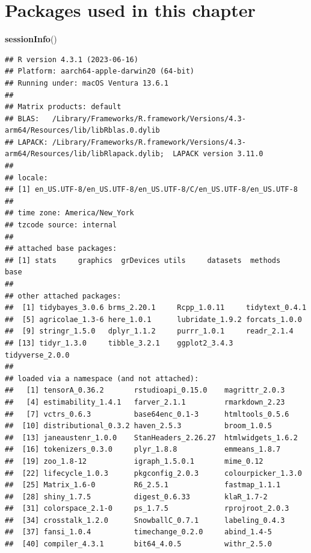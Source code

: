 \documentclass[
]{book}
\newenvironment{Shaded}{\begin{snugshade}}{\end{snugshade}}
\newcommand{\FunctionTok}[1]{\textcolor[rgb]{0.13,0.29,0.53}{\textbf{#1}}}
\newcommand{\NormalTok}[1]{#1}
\begin{document}
\section{Packages used in this chapter}\label{packages-used-in-this-chapter-1}

\begin{Shaded}
\begin{Highlighting}[]
\FunctionTok{sessionInfo}\NormalTok{()}
\end{Highlighting}
\end{Shaded}

\begin{verbatim}
## R version 4.3.1 (2023-06-16)
## Platform: aarch64-apple-darwin20 (64-bit)
## Running under: macOS Ventura 13.6.1
## 
## Matrix products: default
## BLAS:   /Library/Frameworks/R.framework/Versions/4.3-arm64/Resources/lib/libRblas.0.dylib 
## LAPACK: /Library/Frameworks/R.framework/Versions/4.3-arm64/Resources/lib/libRlapack.dylib;  LAPACK version 3.11.0
## 
## locale:
## [1] en_US.UTF-8/en_US.UTF-8/en_US.UTF-8/C/en_US.UTF-8/en_US.UTF-8
## 
## time zone: America/New_York
## tzcode source: internal
## 
## attached base packages:
## [1] stats     graphics  grDevices utils     datasets  methods   base     
## 
## other attached packages:
##  [1] tidybayes_3.0.6 brms_2.20.1     Rcpp_1.0.11     tidytext_0.4.1 
##  [5] agricolae_1.3-6 here_1.0.1      lubridate_1.9.2 forcats_1.0.0  
##  [9] stringr_1.5.0   dplyr_1.1.2     purrr_1.0.1     readr_2.1.4    
## [13] tidyr_1.3.0     tibble_3.2.1    ggplot2_3.4.3   tidyverse_2.0.0
## 
## loaded via a namespace (and not attached):
##   [1] tensorA_0.36.2       rstudioapi_0.15.0    magrittr_2.0.3      
##   [4] estimability_1.4.1   farver_2.1.1         rmarkdown_2.23      
##   [7] vctrs_0.6.3          base64enc_0.1-3      htmltools_0.5.6     
##  [10] distributional_0.3.2 haven_2.5.3          broom_1.0.5         
##  [13] janeaustenr_1.0.0    StanHeaders_2.26.27  htmlwidgets_1.6.2   
##  [16] tokenizers_0.3.0     plyr_1.8.8           emmeans_1.8.7       
##  [19] zoo_1.8-12           igraph_1.5.0.1       mime_0.12           
##  [22] lifecycle_1.0.3      pkgconfig_2.0.3      colourpicker_1.3.0  
##  [25] Matrix_1.6-0         R6_2.5.1             fastmap_1.1.1       
##  [28] shiny_1.7.5          digest_0.6.33        klaR_1.7-2          
##  [31] colorspace_2.1-0     ps_1.7.5             rprojroot_2.0.3     
##  [34] crosstalk_1.2.0      SnowballC_0.7.1      labeling_0.4.3      
##  [37] fansi_1.0.4          timechange_0.2.0     abind_1.4-5         
##  [40] compiler_4.3.1       bit64_4.0.5          withr_2.5.0         

\end{verbatim}
\end{document}
